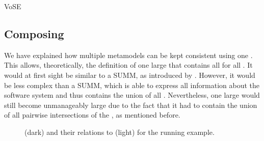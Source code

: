 \begin{copiedFrom}{VoSE}
\subsection*{Composing \commonalities}

We have explained how multiple metamodels can be kept consistent using one \conceptmetamodel.
This allows, theoretically, the definition of one large \conceptmetamodel that contains all \commonalities for all \concretemetamodels.
It would at first sight be similar to a \gls{SUMM}, as introduced by \textcite{atkinson2010a}.
However, it would be less complex than a \gls{SUMM}, which is able to express all information about the software system and thus contains the union of all \concretemetamodels.
Nevertheless, one large \conceptmetamodel would still become unmanageably large due to the fact that it had to contain the union of all pairwise intersections of the \concretemetamodels, as mentioned before.

\begin{figure}
    \centering
    
    \caption[Concept metamodels for the running example]{\Conceptmetamodels (dark) and their relations to \concretemetamodels (light) for the running example.}
    \label{fig:quality:composed_commonalities_example}
\end{figure}


\end{copiedFrom}
